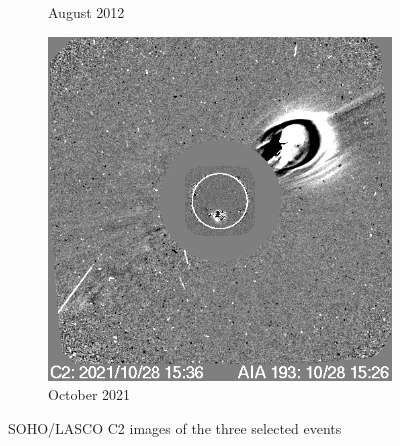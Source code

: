 \message{ !name(main.tex)}\documentclass[12pt]{article}
\begin{document}
\begin{figure}[h!]
\begin{subfigure}[b]{0.3\textwidth}
        \caption[August  2012 CME]{August  2012}
        \label{fig:soho_cme_aug_31_2012}
    \end{subfigure}
    \hfill
    \begin{subfigure}[b]{0.3\textwidth}
        \includegraphics[width=\textwidth]{images/soho_cme_oct_28_2021.png}
        \caption[October  2021]{October  2021}
        \label{fig:soho_cme_oct_28_2021}
    \end{subfigure}
    \caption[SOHO/LASCO C2 images of the selected events]{SOHO/LASCO C2 images of the three selected events}
    \label{fig:cme_events_soho_pics}
\end{figure}
\end{document}
